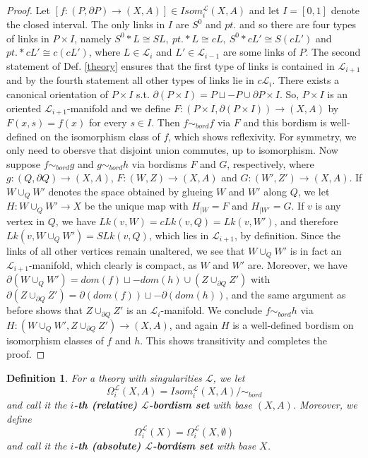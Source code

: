 \documentclass{scrreprt}
\newtheorem{definition}[prop]{Definition}
\begin{document}
\begin{proof}
Let $[f: (P, \partial P) \to (X,A)] \in Isom_{i}^{\mathcal{L}}(X,A)$ and let $I=[0,1]$ denote the closed interval. The only links in $I$ are $S^0$ and $pt.$ and so there are four types of links in $P \times I$, namely $S^0 * L \cong SL,\  pt. * L \cong cL,\  S^0 * cL' \cong S(cL')$ and $pt. * cL' \cong c(cL')$, where $L \in \mathcal{L}_i$ and $L' \in \mathcal{L}_{i-1}$ are some links of $P$. The second statement of Def. \ref{theory} ensures that the first type of links is contained in $\mathcal{L}_{i+1}$ and by the fourth statement all other types of links lie in $c \mathcal{L}_i$. There exists a canonical orientation of $P \times I$ s.t. $\partial (P \times I)= P \sqcup -P \cup \partial P \times I$. So, $P \times I$ is an oriented $\mathcal{L}_{i+1}$-manifold and we define $F: (P \times I, \partial(P \times I)) \to (X,A)$ by $F(x,s)=f(x)$ for every $s \in I$. Then $f \sim_{bord} f$ via $F$ and this bordism is well-defined on the isomorphism class of $f$, which shows reflexivity. For symmetry, we only need to obersve that disjoint union commutes, up to isomorphism. Now suppose $f \sim_{bord} g$ and $g \sim_{bord} h$ via bordisms $F$ and $G$, respectively, where $g: (Q, \partial Q) \to (X,A)$, $F: (W,Z) \to (X,A)$ and $G: (W',Z') \to (X,A)$. If $W \cup_{Q} W'$ denotes the space obtained by glueing $W$ and $W'$ along $Q$, we let $H: W \cup_{Q} W' \to X$ be the unique map with $H_{|W} = F$ and $H_{|W'}=G$. If $v$ is any vertex in $Q$, we have $Lk(v,W)=cLk(v,Q)=Lk(v,W')$, and therefore $Lk(v,W \cup_{Q} W') = SLk(v,Q)$, which lies in $\mathcal{L}_{i+1}$, by definition. Since the links of all other vertices remain unaltered, we see that $W \cup_{Q} W'$ is in fact an $\mathcal{L}_{i+1}$-manifold, which clearly is compact, as $W$ and $W'$ are. Moreover, we have $\partial (W \cup_{Q} W')= dom(f) \sqcup -dom(h) \cup (Z \cup_{\partial Q} Z')$ with $\partial (Z \cup_{\partial Q} Z')= \partial (dom(f)) \sqcup - \partial (dom(h))$, and the same argument as before shows that $Z \cup_{\partial Q} Z'$ is an $\mathcal{L}_i$-manifold. We conclude $f \sim_{bord} h$ via $H: (W \cup_{Q} W',Z \cup_{\partial Q} Z') \to (X,A)$, and again $H$ is a well-defined bordism on isomorphism classes of $f$ and $h$. This shows transitivity and completes the proof.
\end{proof}

\begin{definition}\label{bordismgroup}
For a theory with singularities $\mathcal{L}$, we let  
\begin{equation*}
\Omega_i^\mathcal{L}(X,A)= Isom_i^\mathcal{L}(X,A)/ \sim_{bord}
\end{equation*}
 and call it the \textbf{$i$-th (relative) $\mathcal{L}$-bordism set} with base $(X,A)$. Moreover, we define
\begin{equation*}
\Omega_i^\mathcal{L}(X)=\Omega_i^\mathcal{L}(X, \emptyset)
\end{equation*}
and call it the \textbf{$i$-th (absolute) $\mathcal{L}$-bordism set} with base $X$.
\end{definition}
\end{document}
